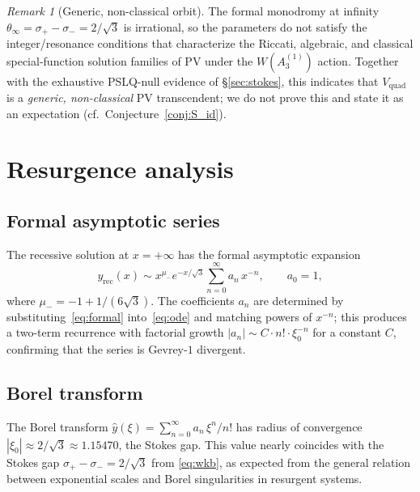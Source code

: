 \documentclass[11pt,a4paper]{article}
\theoremstyle{definition}
\theoremstyle{remark}
\newtheorem{remark}[theorem]{Remark}
\newcommand{\Vq}{V_{\mathrm{quad}}}
\begin{document}
\begin{remark}[Generic, non-classical orbit]
The formal monodromy at infinity
$\theta_\infty=\sigma_+-\sigma_-=2/\sqrt{3}$
is irrational, so the parameters do not
satisfy the integer/resonance conditions
that characterize the Riccati, algebraic,
and classical special-function solution
families of PV under the $W(A_3^{(1)})$
action. Together with the exhaustive
PSLQ-null evidence of \S\ref{sec:stokes},
this indicates that $\Vq$ is a
\emph{generic, non-classical} PV
transcendent; we do not prove this and
state it as an expectation
(cf.\ Conjecture~\ref{conj:S_id}).
\end{remark}


\section{Resurgence analysis}
\label{sec:resurgence}

\subsection{Formal asymptotic series}

The recessive solution at $x=+\infty$ has the
formal asymptotic expansion
\begin{equation}\label{eq:formal}
  y_{\mathrm{rec}}(x) \sim
  x^{\mu_-} e^{-x/\sqrt{3}}
  \sum_{n=0}^{\infty} a_n\,x^{-n},
  \qquad a_0 = 1,
\end{equation}
where $\mu_- = -1 + 1/(6\sqrt{3})$.
The coefficients $a_n$ are determined by
substituting~\eqref{eq:formal}
into~\eqref{eq:ode} and matching powers of
$x^{-n}$; this produces a two-term recurrence
with factorial growth $|a_n| \sim C \cdot n!
\cdot \xi_0^{-n}$ for a constant $C$,
confirming that the series is Gevrey-$1$
divergent.

\subsection{Borel transform}

The Borel transform
$\hat{y}(\xi) = \sum_{n=0}^{\infty}
a_n\,\xi^n / n!$
has radius of convergence
$|\xi_0| \approx 2/\sqrt{3} \approx 1.15470$,
the Stokes gap.
This value nearly coincides with the Stokes gap
$\sigma_+ - \sigma_- = 2/\sqrt{3}$ from
\eqref{eq:wkb}, as expected from the general
relation between exponential scales and Borel
singularities in resurgent systems.
\end{document}
